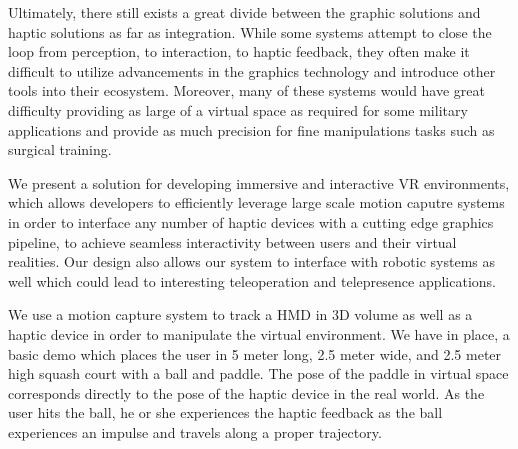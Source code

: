 Ultimately, there still exists a great divide between the graphic solutions and
haptic solutions as far as integration. While some systems attempt to close the
loop from perception, to interaction, to haptic feedback, they often make it
difficult to utilize advancements in the graphics technology and introduce
other tools into their ecosystem.  Moreover, many of these systems would have
great difficulty providing as large of a virtual space as required for some
military applications and provide as much precision for fine manipulations
tasks such as surgical training.

We present a solution for developing immersive and interactive VR environments,
which allows developers to efficiently leverage large scale motion caputre
systems in order to interface any number of haptic devices with a cutting edge
graphics pipeline, to achieve seamless interactivity between users and their
virtual realities. Our design also allows our system to interface with robotic
systems as well which could lead to interesting teleoperation and telepresence
applications.

We use a motion capture system to track a HMD in 3D volume as well as a haptic
device in order to manipulate the virtual environment. We have in place, a
basic demo which places the user in 5 meter long, 2.5 meter wide, and 2.5 meter
high squash court with a ball and paddle.  The pose of the paddle in virtual
space corresponds directly to the pose of the haptic device in the real world.
As the user hits the ball, he or she experiences the haptic feedback as the
ball experiences an impulse and travels along a proper trajectory.

